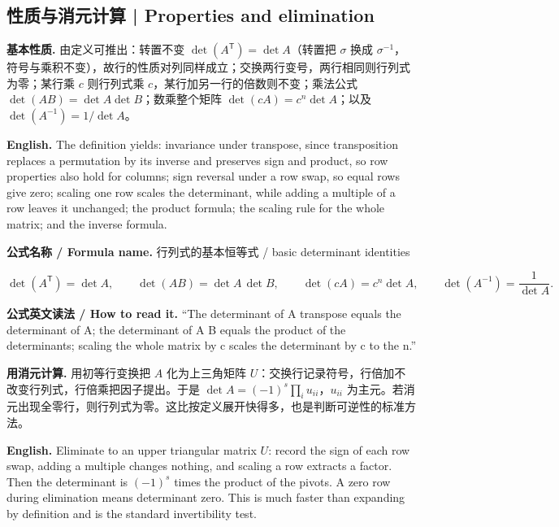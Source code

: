 \documentclass[UTF8,11pt,a4paper]{ctexart}
\newcommand{\EN}[1]{\par\noindent\textbf{English.} #1\par}
\newcommand{\READ}[1]{\par\noindent\textbf{公式英文读法 / How to read it.} #1\par}
\newcommand{\FORMULA}[2]{\par\noindent\textbf{公式名称 / Formula name.} #1 / #2\par}
\begin{document}
\subsection{性质与消元计算 | Properties and elimination}
\noindent\textbf{基本性质.} 由定义可推出：转置不变 $\det(A^{\mathsf T})=\det A$（转置把 $\sigma$ 换成 $\sigma^{-1}$，符号与乘积不变），故行的性质对列同样成立；交换两行变号，两行相同则行列式为零；某行乘 $c$ 则行列式乘 $c$，某行加另一行的倍数则不变；乘法公式 $\det(AB)=\det A\det B$；数乘整个矩阵 $\det(cA)=c^n\det A$；以及 $\det(A^{-1})=1/\det A$。
\EN{The definition yields: invariance under transpose, since transposition replaces a permutation by its inverse and preserves sign and product, so row properties also hold for columns; sign reversal under a row swap, so equal rows give zero; scaling one row scales the determinant, while adding a multiple of a row leaves it unchanged; the product formula; the scaling rule for the whole matrix; and the inverse formula.}
\FORMULA{行列式的基本恒等式}{basic determinant identities}
\[
\det(A^{\mathsf T})=\det A,\qquad \det(AB)=\det A\,\det B,\qquad \det(cA)=c^n\det A,\qquad \det(A^{-1})=\frac{1}{\det A}.
\]
\READ{``The determinant of A transpose equals the determinant of A; the determinant of A B equals the product of the determinants; scaling the whole matrix by c scales the determinant by c to the n.''}
\noindent\textbf{用消元计算.} 用初等行变换把 $A$ 化为上三角矩阵 $U$：交换行记录符号，行倍加不改变行列式，行倍乘把因子提出。于是 $\det A=(-1)^s\prod_i u_{ii}$，$u_{ii}$ 为主元。若消元出现全零行，则行列式为零。这比按定义展开快得多，也是判断可逆性的标准方法。
\EN{Eliminate to an upper triangular matrix $U$: record the sign of each row swap, adding a multiple changes nothing, and scaling a row extracts a factor. Then the determinant is $(-1)^s$ times the product of the pivots. A zero row during elimination means determinant zero. This is much faster than expanding by definition and is the standard invertibility test.}
\end{document}
